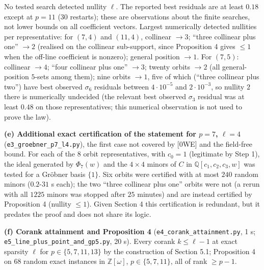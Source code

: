 \documentclass[
  11pt,
  a4paper,
]{article}
\begin{document}
No tested search detected nullity \(\ell\). The reported best residuals
are at least \(0.18\) except at \(p=11\) (30 restarts); these are
observations about the finite searches, not lower bounds on all
coefficient vectors. Largest numerically detected nullities per
representative: for \((7,\allowbreak{}4)\) and \((11,\allowbreak{}4)\), collinear \(\to3\);
``three collinear plus one'' \(\to2\) (realised on the collinear
sub-support, since Proposition 4 gives \(\le1\) when the off-line
coefficient is nonzero); general position \(\to1\). For \((7,\allowbreak{}5)\):
collinear \(\to4\); ``four collinear plus one'' \(\to3\); twenty orbits
\(\to2\) (all general-position \(5\)-sets among them); nine orbits
\(\to1\), five of which (``three collinear plus two'') have best
observed \(\sigma_6\) residuals between \(4\cdot10^{-5}\) and
\(2\cdot10^{-3}\), so nullity \(2\) there is numerically undecided (the
relevant best observed \(\sigma_3\) residual was at least \(0.48\) on
those representatives; this numerical observation is not used to prove
the law).

\textbf{(e) Additional exact certification of the statement for \(p=7\),
\(\ell=4\)} ({\small\texttt{e3\_\allowbreak{}groebner\_\allowbreak{}p7\_\allowbreak{}l4.\allowbreak{}py}}), the first case not
covered by {[}0WE{]} and the field-free bound. For each of the \(8\)
orbit representatives, with \(c_0=1\) (legitimate by Step 1), the ideal
generated by \(\Phi_7(w)\) and the \(4\times4\) minors of \(C\) in
\(\mathbb Q[c_1,\allowbreak{}c_2,\allowbreak{}c_3,\allowbreak{}w]\) was tested for a Gröbner basis \(\{1\}\).
Six orbits were certified with at most \(240\) random minors
(\(0.2\)-\(31\) s each); the two ``three collinear plus one'' orbits
were not (a rerun with all \(1225\) minors was stopped after \(25\)
minutes) and are instead certified by Proposition 4 (nullity \(\le1\)).
Given Section 4 this certification is redundant, but it predates the
proof and does not share its logic.

\textbf{(f) Corank attainment and Proposition 4}
({\small\texttt{e4\_\allowbreak{}corank\_\allowbreak{}attainment.\allowbreak{}py}}, 1 s;
{\small\texttt{e5\_\allowbreak{}line\_\allowbreak{}plus\_\allowbreak{}point\_\allowbreak{}and\_\allowbreak{}gp5.\allowbreak{}py}}, 20 s). Every corank
\(k\le\ell-1\) at exact sparsity \(\ell\) for \(p\in\{5,\allowbreak{}7,\allowbreak{}11,\allowbreak{}13\}\) by
the construction of Section 5.1; Proposition 4 on \(68\) random exact
instances in \(\mathbb Z[\omega]\), \(p\in\{5,\allowbreak{}7,\allowbreak{}11\}\), all of rank
\(\ge p-1\).
\end{document}
